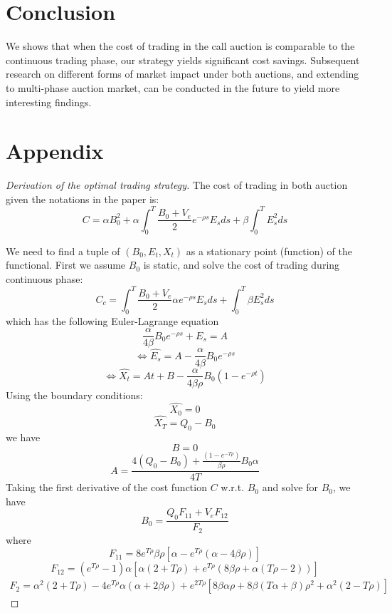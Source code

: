 \documentclass{article}
\begin{document}


\section{Conclusion}\label{secConclusion}
We shows that when the cost of trading in the call auction is comparable to the continuous trading phase, our strategy yields significant cost savings. Subsequent research on different forms of market impact under both auctions, and extending to multi-phase auction market, can be conducted in the future to yield more interesting findings.

\section{Appendix}







\begin{proof}[Derivation of the optimal trading strategy]\label{proof:optimal-strategy}
  The cost of trading in both auction given the notations in the paper is:
  \[
    C = \alpha B_0^2  + \alpha \int_0^T \frac{B_0 + V_e}{2} e^{-\rho s} E_s ds + \beta \int_0^T E_s^2 ds
  \]

  We need to find a tuple of $(B_0, E_t, X_t)$ as a stationary point (function) of the functional. First we assume $B_0$ is static, and solve the cost of trading during continuous phase:
  \[
    C_c = \int_0^T \frac{B_0 + V_e}{2} \alpha e^{-\rho s} E_s ds + \int_0^T  \beta E_s^2 ds
  \]
  which has the following Euler-Lagrange equation
  \[
    \frac{\alpha}{4 \beta} B_0  e^{-\rho s} +E_s = A
  \]
  \[
    \Leftrightarrow \hat{E_s} = A - \frac{\alpha}{4 \beta} B_0 e^{-\rho s}
  \]
  \[
    \Leftrightarrow \hat{X_t} = At + B - \frac{\alpha}{4 \beta \rho}B_ 0 (1 - e^{-\rho t})
  \]
  Using the boundary conditions:
  \[
    \hat{X_0} = 0
  \]
  \[
    \hat{X_T} = Q_0 - B_0
  \]
  we have
  \[
    B = 0
  \]
  \[
    A = \frac{4 (Q_0 - B_0) + \frac{(1 - e^{-T \rho})}{\beta \rho} B_0 \alpha} {4 T}
  \]
  Taking the first derivative of the cost function $C$ w.r.t. $B_0$ and solve for $B_0$, we have
  \[
    B_0 = \frac{Q_0 F_{11} + V_e F_{12}}{F_2}
  \]
  where
  \[
    F_{11} = 8 e^{T \rho} \beta \rho [\alpha - e^{T \rho} (\alpha - 4 \beta \rho)]
  \]
  \[
    F_{12} = (e^{T \rho}-1) \alpha [\alpha (2+T \rho) + e^{T \rho} (8 \beta \rho + \alpha (T \rho - 2 ))]
  \]
  \[
    \begin{split}
      F_2 = \alpha^2 (2 + T \rho) - 4 e^{T \rho} \alpha (\alpha + 2 \beta \rho)
      + e^{2 T \rho} [8 \beta \alpha \rho + 8 \beta (T \alpha + \beta) \rho^2 + \alpha^2 (2 - T \rho)]
    \end{split}
  \]

\end{proof}



\end{document}

